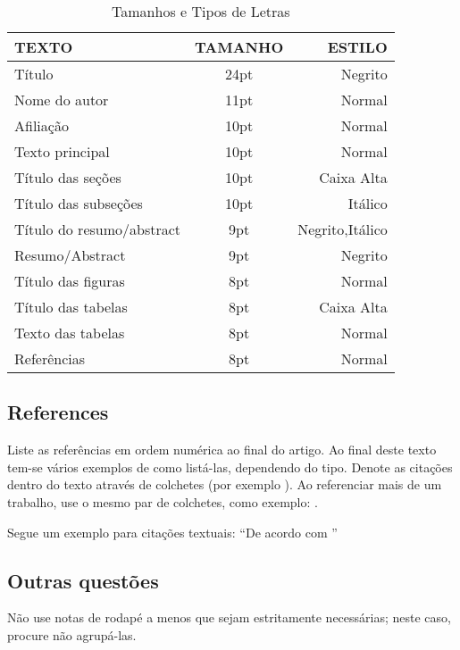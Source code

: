 \begin{table}[h]
\centering
\caption{Tamanhos e Tipos de Letras}
\label{tab:tabela1}
\begin{adjustbox}{max width=\textwidth}
\begin{tabular}{lcr}
\hline
TEXTO                     & TAMANHO & ESTILO          \\ \hline
Título                    & 24pt    & Negrito         \\
Nome do autor             & 11pt    & Normal          \\
Afiliação                 & 10pt    & Normal          \\
Texto principal           & 10pt    & Normal          \\
Título das seções         & 10pt    & Caixa Alta      \\
Título das subseções      & 10pt    & Itálico         \\
Título do resumo/abstract & 9pt     & Negrito,Itálico \\
Resumo/Abstract           & 9pt     & Negrito         \\
Título das figuras        & 8pt     & Normal          \\
Título das tabelas        & 8pt     & Caixa Alta      \\
Texto das tabelas         & 8pt     & Normal          \\
Referências               & 8pt     & Normal          \\ \hline
\end{tabular}
\end{adjustbox}
\end{table}



\subsection{References}

Liste as referências em ordem numérica ao final do artigo. Ao final deste texto tem-se vários exemplos de como listá-las, dependendo do tipo. Denote as citações dentro do texto através de colchetes (por exemplo \cite{LIMA2018}). Ao referenciar mais de um trabalho, use o mesmo par de colchetes, como exemplo: \cite{LUCKMANN2008,livro-unoesc,NR10,abntex2modelo}. 

Segue um exemplo para citações textuais: ``De acordo com \textcite{CHAPMAN2013}'' 

\subsection{Outras questões}
Não use notas de rodapé a menos que sejam estritamente necessárias; neste caso, procure não agrupá-las. 
